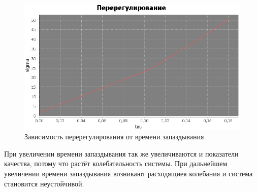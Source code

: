 \documentclass[12pt]{article}
\begin{document}
\newpage
\begin{figure}[h!]
     \centering
    \includegraphics[width = \linewidth]{перерегулирование.png}
    \caption{Зависимость перерегулирования от времени запаздывания}
\end{figure} 
При увеличении времени запаздывания так же увеличиваются и показатели качества, потому что растёт колебательность системы. При дальнейшем увеличении времени запаздывания возникают расходящиея колебания и система становится неустойчивой.  
\newpage
\end{document}
